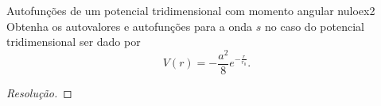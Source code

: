 \begin{exercício}{Autofunções de um potencial tridimensional com momento angular nulo}{ex2}
    Obtenha os autovalores e autofunções para a onda \(s\) no caso do potencial tridimensional ser dado por
    \begin{equation*}
        V(r) = -\frac{a^2}{8} e^{-\frac{r}{r_0}}.
    \end{equation*}
\end{exercício}
\begin{proof}[Resolução]
    
\end{proof}
